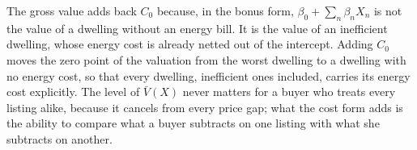 The gross value adds back $C_0$ because, in the bonus form, $\beta_0+\sum_n\beta_nX_n$ is not the value of a dwelling without an energy bill. It is the value of an inefficient dwelling, whose energy cost is already netted out of the intercept. Adding $C_0$ moves the zero point of the valuation from the worst dwelling to a dwelling with no energy cost, so that every dwelling, inefficient ones included, carries its energy cost explicitly. The level of $\bar V(X)$ never matters for a buyer who treats every listing alike, because it cancels from every price gap; what the cost form adds is the ability to compare what a buyer subtracts on one listing with what she subtracts on another.
